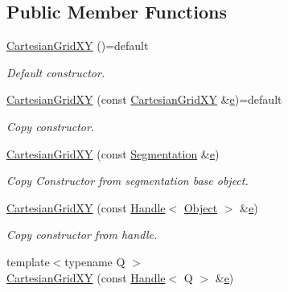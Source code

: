 \subsection*{Public Member Functions}
\begin{DoxyCompactItemize}
\item 
\hyperlink{class_d_d4hep_1_1_geometry_1_1_cartesian_grid_x_y_a12eced6e1ac9a7679039debd4246004e}{Cartesian\+Grid\+XY} ()=default
\begin{DoxyCompactList}\small\item\em Default constructor. \end{DoxyCompactList}\item 
\hyperlink{class_d_d4hep_1_1_geometry_1_1_cartesian_grid_x_y_a5c1ffaeacff4e13e96db1bcdd21ef8c5}{Cartesian\+Grid\+XY} (const \hyperlink{class_d_d4hep_1_1_geometry_1_1_cartesian_grid_x_y}{Cartesian\+Grid\+XY} \&\hyperlink{_volumes_8cpp_a8a9a1f93e9b09afccaec215310e64142}{e})=default
\begin{DoxyCompactList}\small\item\em Copy constructor. \end{DoxyCompactList}\item 
\hyperlink{class_d_d4hep_1_1_geometry_1_1_cartesian_grid_x_y_ae96dc4f394b3eaded63e07e88fa97e62}{Cartesian\+Grid\+XY} (const \hyperlink{class_d_d4hep_1_1_geometry_1_1_segmentation}{Segmentation} \&\hyperlink{_volumes_8cpp_a8a9a1f93e9b09afccaec215310e64142}{e})
\begin{DoxyCompactList}\small\item\em Copy Constructor from segmentation base object. \end{DoxyCompactList}\item 
\hyperlink{class_d_d4hep_1_1_geometry_1_1_cartesian_grid_x_y_a5ac01bc898ef0925a5f80e2df58da136}{Cartesian\+Grid\+XY} (const \hyperlink{class_d_d4hep_1_1_handle}{Handle}$<$ \hyperlink{class_d_d4hep_1_1_geometry_1_1_cartesian_grid_x_y_ab59ffe7391d8eb8e0b922e7965272808}{Object} $>$ \&\hyperlink{_volumes_8cpp_a8a9a1f93e9b09afccaec215310e64142}{e})
\begin{DoxyCompactList}\small\item\em Copy constructor from handle. \end{DoxyCompactList}\item 
{\footnotesize template$<$typename Q $>$ }\\\hyperlink{class_d_d4hep_1_1_geometry_1_1_cartesian_grid_x_y_a0373710f1541e1f57d6fb0a9011a60ab}{Cartesian\+Grid\+XY} (const \hyperlink{class_d_d4hep_1_1_handle}{Handle}$<$ Q $>$ \&\hyperlink{_volumes_8cpp_a8a9a1f93e9b09afccaec215310e64142}{e})

\end{DoxyCompactItemize}
